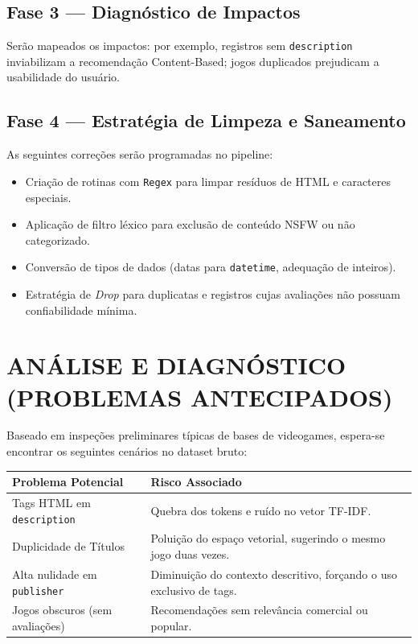 \documentclass[12pt,a4paper]{article}
\begin{document}
\subsection{Fase 3 --- Diagnóstico de Impactos}
Serão mapeados os impactos: por exemplo, registros sem \texttt{description} inviabilizam a recomendação Content-Based; jogos duplicados prejudicam a usabilidade do usuário.

\subsection{Fase 4 --- Estratégia de Limpeza e Saneamento}
As seguintes correções serão programadas no pipeline:
\begin{itemize}
    \item Criação de rotinas com \texttt{Regex} para limpar resíduos de HTML e caracteres especiais.
    \item Aplicação de filtro léxico para exclusão de conteúdo NSFW ou não categorizado.
    \item Conversão de tipos de dados (datas para \texttt{datetime}, adequação de inteiros).
    \item Estratégia de \textit{Drop} para duplicatas e registros cujas avaliações não possuam confiabilidade mínima.
\end{itemize}

\section{ANÁLISE E DIAGNÓSTICO (PROBLEMAS ANTECIPADOS)}
Baseado em inspeções preliminares típicas de bases de videogames, espera-se encontrar os seguintes cenários no dataset bruto:

\vspace{0.5cm}
\begin{center}
\begin{tabular}{lp{6cm}}
\hline
\textbf{Problema Potencial} & \textbf{Risco Associado} \\
\hline
Tags HTML em \texttt{description} & Quebra dos tokens e ruído no vetor TF-IDF. \\
Duplicidade de Títulos & Poluição do espaço vetorial, sugerindo o mesmo jogo duas vezes. \\
Alta nulidade em \texttt{publisher} & Diminuição do contexto descritivo, forçando o uso exclusivo de tags. \\
Jogos obscuros (sem avaliações) & Recomendações sem relevância comercial ou popular. \\
\hline
\end{tabular}
\end{center}
\vspace{0.5cm}
\end{document}
